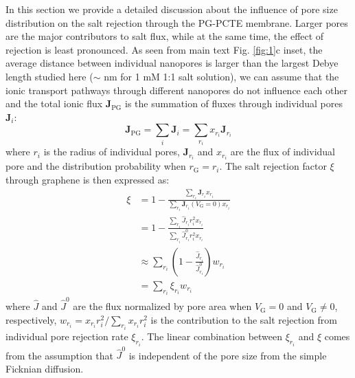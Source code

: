 \documentclass[journal=langd5,email=true, hyperref=true, keywords=false]{achemso}
\begin{document}
In this section we provide a detailed discussion about the
influence of pore size distribution on the salt rejection through the
PG-PCTE membrane. Larger pores are the major contributors to salt flux, while at the same time, the effect of rejection is least pronounced.
As seen from main text Fig. \ref{fig:1}c
inset, the average distance between individual nanopores is larger
than the largest Debye length studied here ($\sim{}$ \unit[30]{nm} for 1 mM 1:1
salt solution), we can assume that the ionic transport pathways
through different nanopores do not influence each other and the total
ionic flux $\boldsymbol{J}_{\mathrm{PG}}$ is the summation of fluxes
through individual pores $\boldsymbol{J}_{i}$:
\begin{equation}
\label{eq:J-total}
\boldsymbol{J}_{\mathrm{PG}} = \sum_{i} \boldsymbol{J}_{i} = \sum_{r_{i}} x_{r_{i}} \boldsymbol{J}_{r_{i}}
\end{equation}
where $r_{i}$ is the radius of individual pores,
$\boldsymbol{J}_{r_{i}}$ and $x_{r_{i}}$ are the flux of individual
pore and the distribution probability when
$r_{\mathrm{G}} = r_{i}$. The salt rejection factor
$\xi$ through graphene is then expressed as:
\begin{equation}
  \label{eq:xi-pore}
  \begin{aligned}
    \xi &= 1 - \frac{\sum_{r_{i}} \boldsymbol{J}_{r_{i}} x_{r_{i}}}
           {\sum_{r_{i}} \boldsymbol{J}_{r_{i}}(V_{\mathrm{G}} = 0) x_{r_{i}}} \\
           &= 1 - \frac{\sum_{r_{i}} \hat{J}_{r_{i}} r_{i}^{2} x_{r_{i}}}
           {\sum_{r_{i}} \hat{J}_{r_{i}}^{0} r_{i}^{2} x_{r_{i}}} \\
           &\approx \sum_{r_{i}} \left(1 -  \frac{\hat{J}_{r_{i}}}{\hat{J}_{r_{i}}^{0}}\right) w_{r_{i}} \\
           &= \sum_{r_{i}} \xi_{r_{i}} w_{r_{i}}
  \end{aligned}
\end{equation}
where $\hat{J}$ and $\hat{J}^{0}$ are the flux normalized by pore area
when $V_{\mathrm{G}} = 0$ and $V_{\mathrm{G}} \neq 0$, respectively,
$w_{r_{i}} = x_{r_{i}} r_{i}^{2} / \sum_{r_{i}} x_{r_{i}} r_{i}^{2}$ is
the contribution to the salt rejection from individual pore rejection
rate $\xi_{r_{i}}$. The linear combination between $\xi_{r_{i}}$ and
$\xi$ comes from the assumption that $\hat{J}^{0}$ is independent of
the pore size from the simple Ficknian diffusion.
\end{document}
